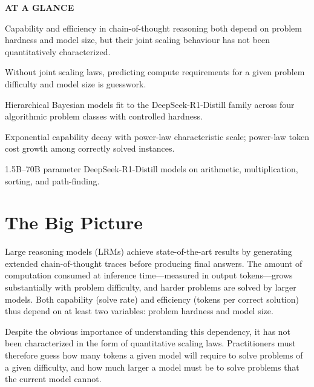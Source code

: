 \documentclass[10pt,twocolumn]{article}
\begin{document}
\begin{mdframed}[backgroundcolor=boxgray,linecolor=rulered,linewidth=1pt,
    innerleftmargin=6pt,innerrightmargin=6pt,
    innertopmargin=6pt,innerbottommargin=6pt]
\textbf{\small AT A GLANCE}\par\vspace{4pt}
\begin{description}[leftmargin=0pt,labelsep=4pt,itemsep=2pt,parsep=0pt,
    font=\small\bfseries]
  \item[Problem:] Capability and efficiency in chain-of-thought reasoning
    both depend on problem hardness and model size, but their joint scaling
    behaviour has not been quantitatively characterized.
  \item[Why it matters:] Without joint scaling laws, predicting compute
    requirements for a given problem difficulty and model size is guesswork.
  \item[Method:] Hierarchical Bayesian models fit to the DeepSeek-R1-Distill
    family across four algorithmic problem classes with controlled hardness.
  \item[Result:] Exponential capability decay with power-law characteristic
    scale; power-law token cost growth among correctly solved instances.
  \item[Evidence:] 1.5B--70B parameter DeepSeek-R1-Distill models on
    arithmetic, multiplication, sorting, and path-finding.
\end{description}
\end{mdframed}

\section{The Big Picture}

Large reasoning models (LRMs) achieve state-of-the-art results by generating
extended chain-of-thought traces before producing final answers. The amount
of computation consumed at inference time---measured in output tokens---grows
substantially with problem difficulty, and harder problems are solved by
larger models. Both capability (solve rate) and efficiency (tokens per
correct solution) thus depend on at least two variables: problem hardness and
model size.

Despite the obvious importance of understanding this dependency, it has not
been characterized in the form of quantitative scaling laws. Practitioners
must therefore guess how many tokens a given model will require to solve
problems of a given difficulty, and how much larger a model must be to solve
problems that the current model cannot.
\end{document}
